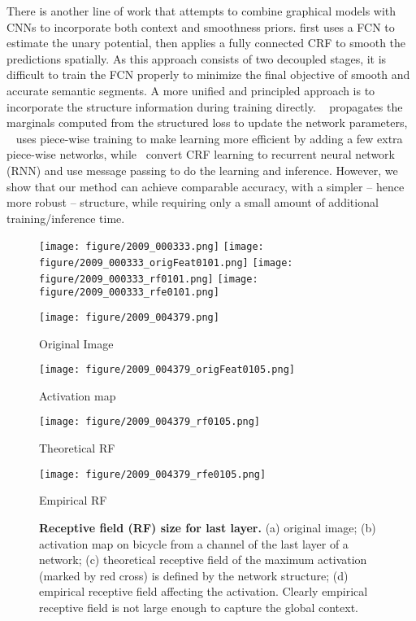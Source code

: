 \documentclass{article} \usepackage{iclr2016_conference}
\begin{document}
There is another line of work that attempts to combine graphical models with CNNs to incorporate both context and smoothness priors. \cite{chen2014semantic} first uses a FCN to estimate the unary potential, then applies a fully connected CRF to smooth the predictions spatially. As this approach consists of two decoupled stages, it is difficult to train the FCN properly to minimize the final objective of smooth and accurate semantic segments. A more unified and principled approach is to incorporate the structure information during training directly. ~\cite{schwing2015fully} propagates the marginals computed from the structured loss to update the network parameters, ~\cite{lin2015efficient} uses piece-wise training to make learning more efficient by adding a few extra piece-wise networks, while~\cite{zheng2015conditional} convert CRF learning to recurrent neural network (RNN) and use message passing to do the learning and inference. However, we show that our method can achieve comparable accuracy, with a simpler -- hence more robust -- structure, while requiring only a small amount of additional training/inference time.
\begin{figure}
	\centering
	\texttt{[image: figure/2009\_000333.png]}\hspace{2em}
	\texttt{[image: figure/2009\_000333\_origFeat0101.png]}\hspace{2em}
	\texttt{[image: figure/2009\_000333\_rf0101.png]}\hspace{2em}
	\texttt{[image: figure/2009\_000333\_rfe0101.png]}\\
\begin{subtable}[b]{0.2\linewidth}
		\texttt{[image: figure/2009\_004379.png]}
		\caption{Original Image}
	\end{subtable}
    \hspace{1.8em}
	\begin{subtable}[b]{0.2\linewidth}
		\texttt{[image: figure/2009\_004379\_origFeat0105.png]}
		\caption{Activation map}
	\end{subtable}
    \hspace{1.8em}
	\begin{subtable}[b]{0.2\linewidth}
		\texttt{[image: figure/2009\_004379\_rf0105.png]}
		\caption{Theoretical RF}
	\end{subtable}
    \hspace{1.8em}
	\begin{subtable}[b]{0.2\linewidth}
		\texttt{[image: figure/2009\_004379\_rfe0105.png]}
		\caption{Empirical RF}
	\end{subtable}
	\caption{\textbf{Receptive field (RF) size for last layer.} (a) original image; (b) activation map on bicycle from a channel of the last layer of a network; (c) theoretical receptive field of the maximum activation (marked by red cross) is defined by the network structure; (d) empirical receptive field affecting the activation. Clearly empirical receptive field is not large enough to capture the global context.}
\label{fig:receptivefield}
\end{figure}
\end{document}
